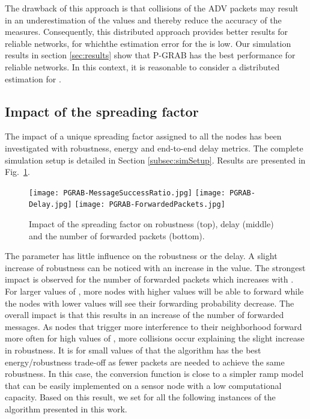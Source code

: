 \documentclass[journal, peerreview, onecolumn, draftcls]{IEEEtran}
\begin{document}
The drawback of this approach is that collisions of the ADV packets may result in an underestimation of the  values and thereby reduce the accuracy of the  measures. Consequently, this distributed approach provides better results for reliable networks, for whichthe estimation error for the  is low. Our simulation results in section \ref{sec:results} show that P-GRAB has the best performance for reliable networks. In this context, it is reasonable to consider a distributed estimation for .

\subsection{Impact of the spreading factor }\label{subsec:Kvalue-PGRAB}

The impact of a unique spreading factor  assigned to all the nodes has been investigated with robustness, energy and end-to-end delay metrics. The complete simulation setup is detailed in Section \ref{subsec:simSetup}. Results are presented in Fig.~\ref{fig:resPGRABKParam}.


\begin{figure}
  \vspace{0.1in}
  \texttt{[image: PGRAB-MessageSuccessRatio.jpg]}
  \vspace{0.1in}
  \texttt{[image: PGRAB-Delay.jpg]}
  \vspace{0.1in}
  \texttt{[image: PGRAB-ForwardedPackets.jpg]}
  \caption{Impact of the spreading factor  on robustness (top), delay (middle) and the number of forwarded packets (bottom).}
  \label{fig:resPGRABKParam}
\end{figure}

The parameter  has little influence on the robustness or the delay. A slight increase of robustness can be noticed with an increase in the  value. The strongest impact is observed for the number of forwarded packets which increases with . For larger values of , more nodes with higher  values will be able to forward while the nodes with lower  values will see their forwarding probability decrease. The overall impact is that this results in an increase of the number of forwarded messages. As nodes that trigger more interference to their neighborhood forward more often for high values of , more collisions occur explaining the slight increase in robustness. It is for small values of  that the algorithm has the best energy/robustness trade-off as fewer packets are needed to achieve the same robustness. In this case, the conversion function is close to a simpler ramp model that can be easily implemented on a sensor node with a low computational capacity. Based on this result, we set  for all the following instances of the  algorithm presented in this work.
\end{document}
